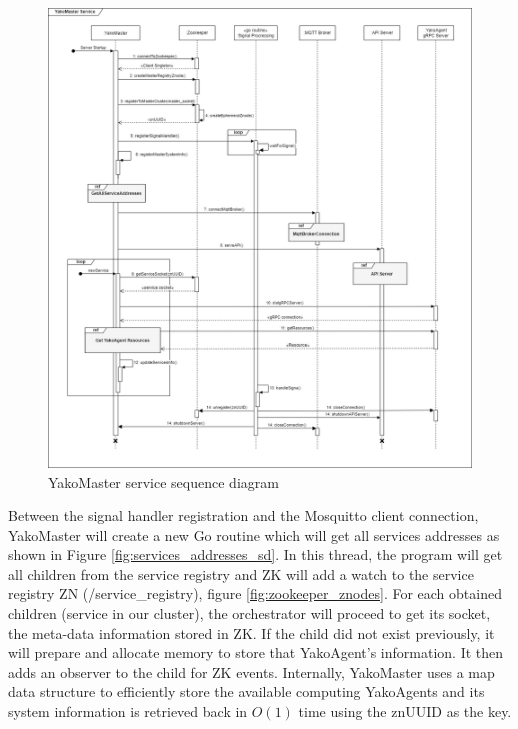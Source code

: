             \begin{figure}[H]
                \centering
                \includegraphics[width=0.8\linewidth]{Images/Backend/YakoMaster SD.png}
                \caption{YakoMaster service sequence diagram}
                \label{fig:yakomaster_sd}
            \end{figure}
            
            Between the signal handler registration and the Mosquitto client connection, YakoMaster will create a new Go routine which will get all services addresses as shown in Figure \ref{fig:services_addresses_sd}. In this thread, the program will get all children from the service registry and ZK will add a watch to the service registry ZN (/service\_registry), figure \ref{fig:zookeeper_znodes}. For each obtained children (service in our cluster), the orchestrator will proceed to get its socket, the meta-data information stored in ZK. If the child did not exist previously, it will prepare and allocate memory to store that YakoAgent's information. It then adds an observer to the child for ZK events.
            Internally, YakoMaster uses a map data structure to efficiently store the available computing YakoAgents and its system information is retrieved back in \(O(1)\) time using the znUUID as the key.
        
